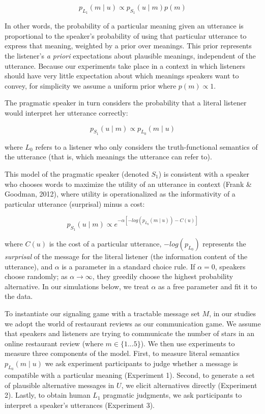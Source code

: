 \documentclass[10pt, letterpaper]{article}
\begin{document}
\[p_{L_1}(m \mid u) \propto p_{S_1} (u \mid m) p(m) \tag{1}\]

\noindent In other words, the probability of a particular meaning given
an utterance is proportional to the speaker's probability of using that
particular utterance to express that meaning, weighted by a prior over
meanings. This prior represents the listener's \emph{a priori}
expectations about plausible meanings, independent of the utterance.
Because our experiments take place in a context in which listeners
should have very little expectation about which meanings speakers want
to convey, for simplicity we assume a uniform prior where
\(p(m) \propto 1\).

The pragmatic speaker in turn considers the probability that a literal
listener would interpret her utterance correctly:

\[p_{S_1}(u \mid m) \propto p_{L_0} (m \mid u) \tag{2}\]

\noindent where \(L_0\) refers to a listener who only considers the
truth-functional semantics of the utterance (that is, which meanings the
utterance can refer to).

This model of the pragmatic speaker (denoted \(S_1\)) is consistent with
a speaker who chooses words to maximize the utility of an utterance in
context (Frank \& Goodman, 2012), where utility is operationalized as
the informativity of a particular utterance (surprisal) minus a cost:

\[p_{S_1}(u \mid m) \propto e^{-\alpha[-log(p_{L_0}(m \mid u)) - C(u)]} \tag{3}\]

\noindent where \(C(u)\) is the cost of a particular utterance,
\(-log(p_{L_0})\) represents the \emph{surprisal} of the message for the
literal listener (the information content of the utterance), and
\(\alpha\) is a parameter in a standard choice rule. If \(\alpha=0\),
speakers choose randomly; as \(\alpha \rightarrow \infty\), they
greedily choose the highest probability alternative. In our simulations
below, we treat \(\alpha\) as a free parameter and fit it to the data.

To instantiate our signaling game with a tractable message set \(M\), in
our studies we adopt the world of restaurant reviews as our
communication game. We assume that speakers and listeners are trying to
communicate the number of stars in an online restaurant review (where
\(m \in \{1...5\}\)). We then use experiments to measure three
components of the model. First, to measure literal semantics
\({p_{L_0} (m \mid u)}\) we ask experiment participants to judge whether
a message is compatible with a particular meaning (Experiment 1).
Second, to generate a set of plausible alternative messages in \(U\), we
elicit alternatives directly (Experiment 2). Lastly, to obtain human
\(L_1\) pragmatic judgments, we ask participants to interpret a
speaker's utterances (Experiment 3).
\end{document}
